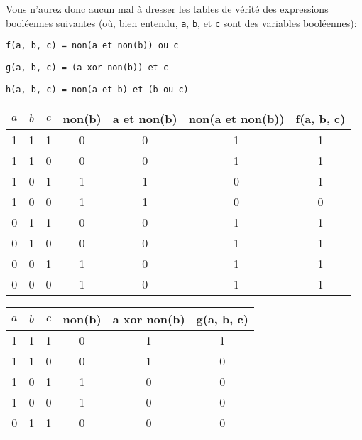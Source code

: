 \documentclass[12pt]{article}
\begin{document}
	\begin{MonExo}
		Vous n'aurez donc aucun mal à dresser les tables de vérité des expressions booléennes suivantes (où, bien entendu, \texttt{a}, \texttt{b}, et \texttt{c} sont des variables booléennes):
		\begin{alphenum}
			\item \texttt{f(a, b, c) = non(a et non(b)) ou c}
			\item \texttt{g(a, b, c) = (a xor non(b)) et c}
			\item \texttt{h(a, b, c) = non(a et b) et (b ou c)}
		\end{alphenum}
	\end{MonExo}
	\begin{MaReponse}
		\begin{alphenum}
			\item 
			\begin{center}		
				\begin{tabular}{|c|c|c|c|c|c|c|}
					\hline
					$a$ & $b$ & $c$ & non(b) & a et non(b) & non(a et non(b))& f(a, b, c)\\ \hline
					1 & 1 & 1 & 0 & 0 & 1 & 1\\ \hline
					1 & 1 & 0 & 0 & 0 & 1 & 1\\ \hline
					1 & 0 & 1 & 1 & 1 & 0 & 1\\ \hline
					1 & 0 & 0 & 1 & 1 & 0 & 0\\ \hline
					0 & 1 & 1 & 0 & 0 & 1 & 1\\ \hline
					0 & 1 & 0 & 0 & 0 & 1 & 1\\ \hline
					0 & 0 & 1 & 1 & 0 & 1 & 1\\ \hline
					0 & 0 & 0 & 1 & 0 & 1 & 1\\ \hline
				\end{tabular}
			\end{center}
			\item 
			\begin{center}		
				\begin{tabular}{|c|c|c|c|c|c|}
					\hline
					$a$ & $b$ & $c$ & non(b) & a xor non(b) & g(a, b, c)\\ \hline
					1 & 1 & 1 & 0 & 1 & 1 \\ \hline
					1 & 1 & 0 & 0 & 1 & 0 \\ \hline
					1 & 0 & 1 & 1 & 0 & 0 \\ \hline
					1 & 0 & 0 & 1 & 0 & 0 \\ \hline
					0 & 1 & 1 & 0 & 0 & 0 \\ \hline

\end{tabular}
\end{center}
\end{alphenum}
\end{MaReponse}
\end{document}
